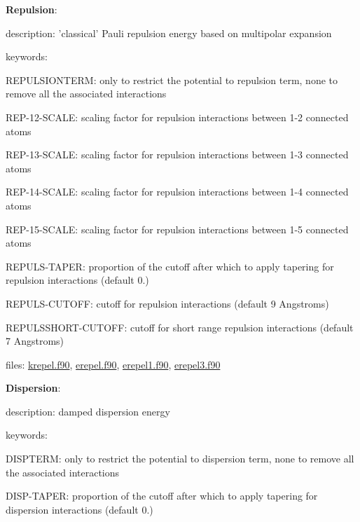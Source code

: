 \begin{DoxyItemize}
\item {\bfseries Repulsion}\-:
\begin{DoxyItemize}
\item description\-: 'classical' Pauli repulsion energy based on multipolar expansion
\item keywords\-:
\begin{DoxyItemize}
\item R\-E\-P\-U\-L\-S\-I\-O\-N\-T\-E\-R\-M\-: only to restrict the potential to repulsion term, none to remove all the associated interactions
\item R\-E\-P-\/12-\/\-S\-C\-A\-L\-E\-: scaling factor for repulsion interactions between 1-\/2 connected atoms
\item R\-E\-P-\/13-\/\-S\-C\-A\-L\-E\-: scaling factor for repulsion interactions between 1-\/3 connected atoms
\item R\-E\-P-\/14-\/\-S\-C\-A\-L\-E\-: scaling factor for repulsion interactions between 1-\/4 connected atoms
\item R\-E\-P-\/15-\/\-S\-C\-A\-L\-E\-: scaling factor for repulsion interactions between 1-\/5 connected atoms
\item R\-E\-P\-U\-L\-S-\/\-T\-A\-P\-E\-R\-: proportion of the cutoff after which to apply tapering for repulsion interactions (default 0.)
\item R\-E\-P\-U\-L\-S-\/\-C\-U\-T\-O\-F\-F\-: cutoff for repulsion interactions (default 9 Angstroms)
\item R\-E\-P\-U\-L\-S\-S\-H\-O\-R\-T-\/\-C\-U\-T\-O\-F\-F\-: cutoff for short range repulsion interactions (default 7 Angstroms)
\end{DoxyItemize}
\item files\-: \hyperlink{krepel_8f90}{krepel.\-f90}, \hyperlink{erepel_8f90}{erepel.\-f90}, \hyperlink{erepel1_8f90}{erepel1.\-f90}, \hyperlink{erepel3_8f90}{erepel3.\-f90}
\end{DoxyItemize}
\item {\bfseries Dispersion}\-:
\begin{DoxyItemize}
\item description\-: damped dispersion energy
\item keywords\-:
\begin{DoxyItemize}
\item D\-I\-S\-P\-T\-E\-R\-M\-: only to restrict the potential to dispersion term, none to remove all the associated interactions
\item D\-I\-S\-P-\/\-T\-A\-P\-E\-R\-: proportion of the cutoff after which to apply tapering for dispersion interactions (default 0.)

\end{DoxyItemize}
\end{DoxyItemize}
\end{DoxyItemize}
